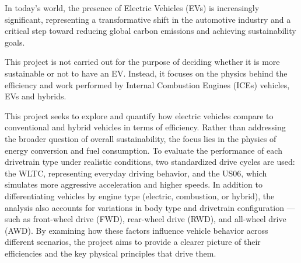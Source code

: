 In today's world, the presence of Electric Vehicles (EVs) is increasingly significant, representing a transformative shift in the automotive industry and a critical step toward reducing global carbon emissions and achieving sustainability goals.

This project is not carried out for the purpose of deciding whether it is more sustainable or not to have an EV. Instead, it focuses on the physics behind the efficiency and work performed by Internal Combustion Engines (ICEs) vehicles, EVs and hybrids.

This project seeks to explore and quantify how electric vehicles compare to conventional and hybrid vehicles in terms of efficiency. Rather than addressing the broader question of overall sustainability, the focus lies in the physics of energy conversion and fuel consumption. To evaluate the performance of each drivetrain type under realistic conditions, two standardized drive cycles are used: the WLTC, representing everyday driving behavior, and the US06, which simulates more aggressive acceleration and higher speeds. In addition to differentiating vehicles by engine type (electric, combustion, or hybrid), the analysis also accounts for variations in body type and drivetrain configuration — such as front-wheel drive (FWD), rear-wheel drive (RWD), and all-wheel drive (AWD). By examining how these factors influence vehicle behavior across different scenarios, the project aims to provide a clearer picture of their efficiencies and the key physical principles that drive them.
